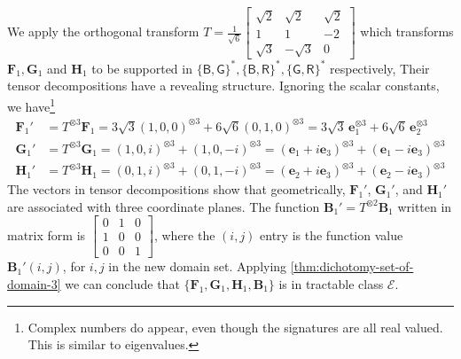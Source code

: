 \documentclass[11pt]{article}
\newcommand{\db}{\mathsf{B}}
\newcommand{\dg}{\mathsf{G}}
\newcommand{\dr}{\mathsf{R}}
\newcommand{\teh}{^{\otimes 3}}
\newcommand{\tew}{^{\otimes 2}}
\newcommand{\tractBGGRBR}{$\mathscr{E}$\xspace}
\begin{document}
We apply the orthogonal transform $T = \frac{1}{\sqrt{6}} \left[ \begin{smallmatrix}
    \sqrt{2} & \sqrt{2} & \sqrt{2} \\
    1 & 1 & -2\\
    \sqrt{3} & - \sqrt{3} & 0
\end{smallmatrix} \right]$
which transforms $\mathbf{F}_1, \mathbf{G}_1$ and $\mathbf{H}_1$ to be supported
in $\{\db, \dg\}^*, \{\db, \dr\}^*, \{\dg, \dr\}^*$ respectively,
Their tensor decompositions  have a revealing structure. 
Ignoring the scalar constants, we have\footnote{Complex numbers do appear,  even though the signatures are all real valued. This is similar to  eigenvalues.}
\begin{align*}
    \mathbf{F}_1' &= T \teh \mathbf{F}_1 = 3 \sqrt{3} (1, 0, 0)\teh + 6 \sqrt{6} (0, 1, 0)\teh = 3 \sqrt{3}  \, \mathbf{e}_1\teh + 6 \sqrt{6} \,\mathbf{e}_2\teh \\
    \mathbf{G}_1' &= T \teh \mathbf{G}_1 = (1, 0, i)\teh + (1, 0, -i)\teh = (\mathbf{e}_1 + i \mathbf{e}_3)\teh + (\mathbf{e}_1 - i \mathbf{e}_3)\teh \\
    \mathbf{H}_1' &= T \teh \mathbf{H}_1 = (0, 1, i)\teh + (0, 1, -i)\teh = (\mathbf{e}_2 + i \mathbf{e}_3)\teh + (\mathbf{e}_2 - i \mathbf{e}_3)\teh
\end{align*}
The vectors in tensor decompositions show that geometrically, $\mathbf{F}_1'$, $\mathbf{G}_1'$, and $\mathbf{H}_1'$ are associated with 
three coordinate planes.
The function $\mathbf{B}_1' = T \tew \mathbf{B}_1$ written in matrix form
is $\left[ \begin{smallmatrix}
    0 & 1 & 0\\
    1 & 0 & 0 \\
    0 & 0 & 1
\end{smallmatrix} \right]$, where the $(i,j)$ entry
is the function value $\mathbf{B}_1'(i,j)$, for $i, j$ in the new domain set.
Applying  \cref{thm:dichotomy-set-of-domain-3}
we can conclude  that $\{\mathbf{F}_1, \mathbf{G}_1, \mathbf{H}_1, \mathbf{B}_1\}$ is 
in tractable class \tractBGGRBR. 
\end{document}

